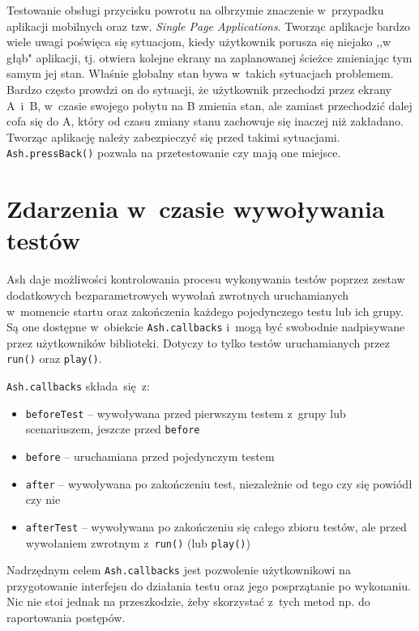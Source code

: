\documentclass[brudnopis]{xmgr}
\begin{document}
Testowanie obsługi przycisku powrotu na olbrzymie znaczenie w~przypadku aplikacji mobilnych oraz tzw. \textit{Single Page Applications}. Tworząc aplikacje bardzo wiele uwagi poświęca się sytuacjom, kiedy użytkownik porusza się niejako ,,w głąb" aplikacji, tj. otwiera kolejne ekrany na zaplanowanej ścieżce zmieniając tym samym jej stan.  Właśnie globalny stan bywa w~takich sytuacjach problemem. Bardzo często prowdzi on do sytuacji, że użytkownik przechodzi przez ekrany A~i~B, w~czasie swojego pobytu na B zmienia stan, ale zamiast przechodzić dalej cofa się do A, który od czasu zmiany stanu zachowuje się inaczej niż zakładano. Tworząc aplikację należy zabezpieczyć się przed takimi sytuacjami. \texttt{Ash.pressBack()} pozwala na przetestowanie czy mają one miejsce. 

\section{Zdarzenia w~czasie wywoływania testów}

Ash daje możliwości kontrolowania procesu wykonywania testów poprzez zestaw dodatkowych bezparametrowych wywołań zwrotnych uruchamianych w~momencie startu oraz zakończenia każdego pojedynczego testu lub ich grupy. Są one dostępne w~obiekcie \texttt{Ash.callbacks} i~mogą być swobodnie nadpisywane przez użytkowników biblioteki. Dotyczy to tylko testów uruchamianych przez \texttt{run()} oraz \texttt{play()}.

\texttt{Ash.callbacks} składa~się~z:

\begin{itemize}
  \item \texttt{beforeTest} -- wywoływana przed pierwszym testem z~grupy lub scenariuszem, jeszcze przed \texttt{before}
  \item \texttt{before} -- uruchamiana przed pojedynczym testem
  \item \texttt{after} -- wywoływana po zakończeniu test, niezależnie od tego czy się powiódł czy nie
  \item \texttt{afterTest} -- wywoływana po zakończeniu się całego zbioru testów, ale przed wywołaniem zwrotnym z~\texttt{run()} (lub \texttt{play()}) 
\end{itemize}

Nadrzędnym celem \texttt{Ash.callbacks} jest pozwolenie użytkownikowi na przygotowanie interfejsu do działania testu oraz jego posprzątanie po wykonaniu. Nic nie stoi jednak na przeszkodzie, żeby skorzystać z~tych metod np. do raportowania postępów.
\end{document}
